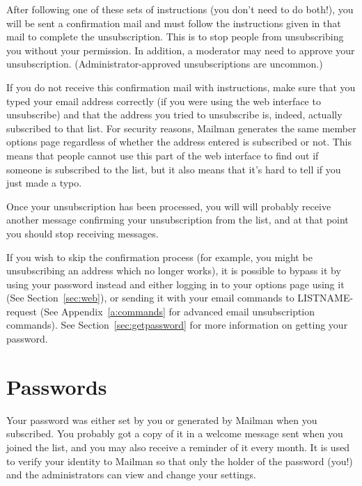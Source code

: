 \documentclass{howto}
\begin{document}
After following one of these sets of instructions (you don't need to do
both!), you will be sent a confirmation mail and must follow the
instructions given in that mail to complete the unsubscription.  This is to
stop people from unsubscribing you without your permission.  In addition, a
moderator may need to approve your unsubscription.  (Administrator-approved
unsubscriptions are uncommon.)

If you do not receive this confirmation mail with instructions, make sure
that you typed your email address correctly (if you were using the web 
interface to unsubscribe) and that the address you tried
to unsubscribe is, indeed, actually subscribed to that list.  For security
reasons, Mailman generates the same member options page regardless of
whether the address entered is subscribed or not.  This means that people
cannot use this part of the web interface to find out if someone is
subscribed to the list, but it also means that it's hard to tell if you just
made a typo.

Once your unsubscription has been processed, you will will probably receive
another message confirming your unsubscription from the list, and at that
point you should stop receiving messages.

If you wish to skip the confirmation process (for example, you might be
unsubscribing an address which no longer works), it is possible to bypass it by
using your password instead and either logging in to your options page using
it (See Section~\ref{sec:web}), or sending it with your email commands to
LISTNAME-request (See Appendix~\ref{a:commands} for advanced email 
unsubscription commands). See Section~\ref{sec:getpassword} for more 
information on getting your password.

\section{Passwords\label{sec:password}}
Your password was either set by you or generated by Mailman when you
subscribed. 
You probably got a copy of it in a
welcome message sent when you joined the list, and you may also receive a
reminder of it every month.  It is used to verify your identity to Mailman
so that only the holder of the password (you!) and the administrators
can view and change your settings.  

\end{document}
